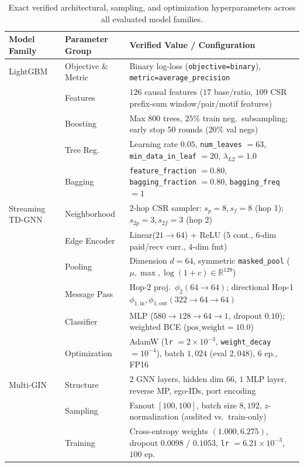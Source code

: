 \documentclass[pdflatex,sn-mathphys,Numbered]{sn-jnl}
\theoremstyle{thmstyleone}
\begin{document}
\begin{appendices}
\begin{table}[t]
\centering
\caption{Exact verified architectural, sampling, and optimization hyperparameters across all evaluated model families.}
\label{tab:hyperparameters}
\scriptsize
\setlength{\tabcolsep}{3pt}
\begin{tabular}{@{}ll>{\raggedright\arraybackslash}p{6.0cm}@{}}
\toprule
\textbf{Model Family} & \textbf{Parameter Group} & \textbf{Verified Value / Configuration} \\
\midrule
LightGBM & Objective \& Metric & Binary log-loss (\texttt{objective=binary}), \texttt{metric=average\_precision} \\
 & Features & $126$ causal features ($17$ base/ratio, $109$ CSR prefix-sum window/pair/motif features) \\
 & Boosting & Max $800$ trees, $25\%$ train neg.\ subsampling; early stop $50$ rounds ($20\%$ val negs) \\
 & Tree Reg. & Learning rate $0.05$, \texttt{num\_leaves} $= 63$, \texttt{min\_data\_in\_leaf} $= 20$, $\lambda_{L2} = 1.0$ \\
 & Bagging & \texttt{feature\_fraction} $= 0.80$, \texttt{bagging\_fraction} $= 0.80$, \texttt{bagging\_freq} $= 1$ \\
\midrule
Streaming TD-GNN & Neighborhood & $2$-hop CSR sampler: $s_p=8, s_f=8$ (hop 1); $s_{2p}=3, s_{2f}=3$ (hop 2) \\
 & Edge Encoder & Linear($21 \to 64$) + ReLU ($5$ cont., $6$-dim paid/recv curr., $4$-dim fmt) \\
 & Pooling & Dimension $d = 64$, symmetric \texttt{masked\_pool} ($\mu, \max, \log(1+c) \in \mathbb{R}^{129}$) \\
 & Message Pass & Hop-2 proj.\ $\phi_2(64 \to 64)$; directional Hop-1 $\phi_{1,\text{in}}, \phi_{1,\text{out}}(322 \to 64 \to 64)$ \\
 & Classifier & MLP ($580 \to 128 \to 64 \to 1$, dropout $0.10$); weighted BCE ($\text{pos\_weight} = 10.0$) \\
 & Optimization & AdamW (\texttt{lr} $= 2 \times 10^{-3}$, \texttt{weight\_decay} $= 10^{-4}$), batch $1{,}024$ (eval $2{,}048$), 6 ep., FP16 \\
\midrule
Multi-GIN~\cite{egressy2024multigraph} & Structure & $2$ GNN layers, hidden dim $66$, $1$ MLP layer, reverse MP, ego-IDs, port encoding \\
 & Sampling & Fanout $[100, 100]$, batch size $8{,}192$, $z$-normalization (audited vs.\ train-only) \\
 & Training & Cross-entropy weights $(1.000, 6.275)$, dropout $0.0098$ / $0.1053$, \texttt{lr} $= 6.21 \times 10^{-3}$, $100$ ep. \\
\bottomrule
\end{tabular}
\end{table}

\end{appendices}


\end{document}
